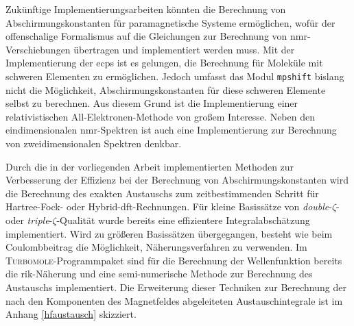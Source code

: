 Zukünftige Implementierungsarbeiten könnten die Berechnung von Abschirmungskonstanten für paramagnetische Systeme ermöglichen, wofür der offenschalige Formalismus auf die Gleichungen zur Berechnung von \ac{nmr}-Verschiebungen übertragen und implementiert werden muss. Mit der Implementierung der \acp{ecp} ist es gelungen, die Berechnung für Moleküle mit schweren Elementen zu ermöglichen. Jedoch umfasst das Modul \texttt{mpshift} bislang nicht die Möglichkeit, Abschirmungskonstanten für diese schweren Elemente selbst zu berechnen. Aus diesem Grund ist die Implementierung einer relativistischen All-Elektronen-Methode von großem Interesse. Neben den eindimensionalen \ac{nmr}-Spektren ist auch eine Implementierung zur Berechnung von zweidimensionalen Spektren denkbar.  

Durch die in der vorliegenden Arbeit implementierten Methoden zur Verbesserung der Effizienz bei der Berechnung von Abschirmungskonstanten wird die Berechnung des exakten Austauschs zum zeitbestimmenden Schritt für Hartree-Fock- oder Hybrid-\ac{dft}-Rechnungen. Für kleine Basissätze von \textit{double}-$\zeta$- oder \textit{triple}-$\zeta$-Qualität wurde bereits eine effizientere Integralabschätzung implementiert. Wird zu größeren Basissätzen übergegangen, besteht wie beim Coulombbeitrag die Möglichkeit, Näherungsverfahren zu verwenden. Im \textsc{Turbomole}-Programmpaket sind für die Berechnung der Wellenfunktion   bereits die \ac{rik}-Näherung\supercite{weigend2002fully} und eine semi-numerische Methode\supercite{plessow2012seminumerical} zur Berechnung des Austauschs implementiert. Die Erweiterung dieser Techniken zur Berechnung der nach den Komponenten des Magnetfeldes abgeleiteten Austauschintegrale ist im Anhang \ref{hfaustausch} skizziert. 
\vfill
\newpage
\thispagestyle{empty}
\cleardoublepage


